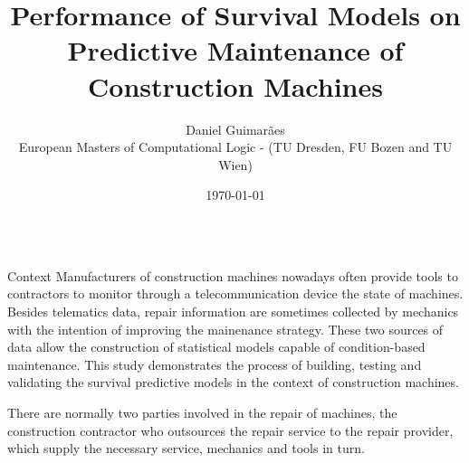 \documentclass[t]{beamer}
\author{
Daniel Guimarães
\\
\vspace{5mm}
\normalsize{European Masters of Computational Logic - }
\normalsize{(TU Dresden, FU Bozen and TU Wien)}
}
\date{\today}
\title{Performance of Survival Models on Predictive Maintenance of Construction Machines}
\begin{document}
\begin{frame}[label={sec:orgc2b2963}]{}
\begin{columns}
\begin{column}{0.3\columnwidth}
\begin{block}{Context}
Manufacturers of construction machines nowadays often provide tools to contractors 
to monitor through a telecommunication device the state of machines. Besides 
telematics data, repair information are sometimes collected by mechanics with 
the intention of improving the mainenance strategy. These two sources of data 
allow the construction of statistical models capable of condition-based 
maintenance. This study demonstrates the process of building, testing and 
validating the survival predictive models in the context of 
construction machines. 

There are normally two parties involved in the repair of machines, the 
construction contractor who outsources the repair service to the repair provider, 
which supply the necessary service, mechanics and tools in turn.


\end{block}
\end{column}
\end{columns}
\end{frame}
\end{document}
